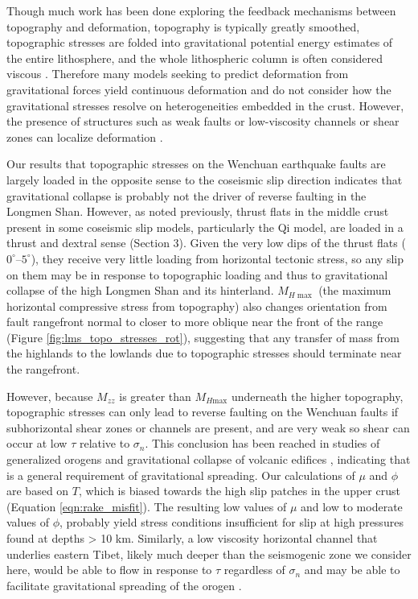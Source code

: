\documentclass[draft,jgrga]{AGUTeX}
\begin{document}
\begin{article}
Though much work has been done exploring the feedback mechanisms between
topography and deformation, topography is typically greatly smoothed,
topographic stresses are folded into gravitational potential energy
estimates of the entire lithosphere, and the whole lithospheric column
is often considered viscous \citep[e.g.,][]{birdpiper80, copleymckenzie2007,
flesch2010gpe}. Therefore many
models seeking to predict deformation from gravitational forces yield
continuous deformation and do not consider how the gravitational
stresses resolve on heterogeneities embedded in the crust. However, the
presence of structures such as weak faults \citep{bird1994} or
low-viscosity channels or shear zones \citep[e.g.,][]{clark2005} can localize
deformation \citep[e.g.,][]{bird1994, fleschbendick2012}.

Our results that topographic stresses on the Wenchuan
earthquake faults are largely loaded in the opposite sense to the
coseismic slip direction indicates that gravitational collapse is probably
not the driver of reverse faulting in the Longmen Shan. However, as
noted previously, thrust flats in the middle crust present in some
coseismic slip models, particularly the Qi model, are loaded in a thrust
and dextral sense (Section 3). Given the very low dips of the thrust flats
($0^{\circ}$--$5^{\circ}$), they receive very little loading from
horizontal tectonic stress, so any slip on them may be in response to
topographic loading and thus to gravitational collapse of the high
Longmen Shan and its hinterland. $M_{H{\mathrm{\max}}}$ (the maximum horizontal
compressive stress from topography) also changes
orientation from fault rangefront normal to closer to more oblique
near the front of the range (Figure \ref{fig:lms_topo_stresses_rot}),
suggesting that any transfer of mass from the highlands to the lowlands
due to topographic stresses should terminate near the rangefront.

However, because $M_{zz}$ is greater than $M_{H{\mathrm{max}}}$
underneath the higher topography, topographic stresses can only lead to
reverse faulting on the Wenchuan faults if subhorizontal shear zones or
channels are present, and are very weak so shear can occur at 
low $\tau$ relative to $\sigma_n$. This conclusion has been reached in
studies of generalized orogens \citep[e.g.,][]{fleschbendick2012} and
gravitational collapse of volcanic edifices \citep[e.g.,][]{byrne2013},
indicating that is a general requirement of gravitational spreading. Our
calculations of $\mu$ and $\phi$ are based on $T$, which is biased
towards the high slip patches in the upper crust (Equation
\ref{eqn:rake_misfit}).  The resulting low values of $\mu$ and low
to moderate values of $\phi$, probably yield stress conditions insufficient
for slip at high pressures found at depths > 10 km.
Similarly, a low viscosity horizontal
channel that underlies eastern Tibet, likely much deeper than the
seismogenic zone we consider here, would be able to flow in response to
$\tau$ regardless of $\sigma_n$ and may be able to facilitate
gravitational spreading of the orogen \citep[e.g.,][]{clark2005, cook2008,
fleschbendick2012}.


\end{article}
\end{document}

